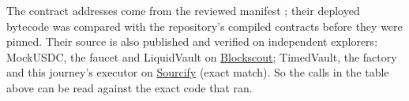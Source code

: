 \documentclass[11pt,a4paper,oneside]{report}
\begin{document}
The contract addresses come from the reviewed manifest ; their deployed bytecode was compared with the repository's compiled contracts before they were pinned. Their source is also published and verified on independent explorers: MockUSDC, the faucet and LiquidVault on \href{https://base-sepolia.blockscout.com}{Blockscout}; TimedVault, the factory and this journey's executor on \href{https://sourcify.dev}{Sourcify} (exact match). So the calls in the table above can be read against the exact code that ran.
\end{document}
